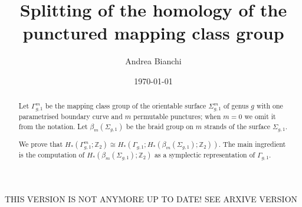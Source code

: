 \documentclass{amsart}
\theoremstyle{plain}
\theoremstyle{definition}
\begin{document}
\title{Splitting of the homology of the punctured mapping class group}

\author{Andrea Bianchi}

\address{Mathematics Institute,
University of Bonn,
Endenicher Allee 60, Bonn,
Germany
}




\date{\today}




\begin{abstract}
Let $\Gamma_{g,1}^m$ be the mapping class group of the orientable surface $\Sigma_{g,1}^m$ of genus $g$ with one parametrised
boundary curve and $m$ permutable punctures; when $m=0$ we omit it from the notation.
Let $\beta_{m}(\Sigma_{g,1})$ be the braid group on $m$ strands
of the surface $\Sigma_{g,1}$.

\noindent We prove that $H_*(\Gamma_{g,1}^m;\mathbb{Z}_2)\cong H_*(\Gamma_{g,1};H_*(\beta_{m}(\Sigma_{g,1});\mathbb{Z}_2))$. The main ingredient
is the computation of $H_*(\beta_{m}(\Sigma_{g,1});\mathbb{Z}_2)$ as a symplectic representation of $\Gamma_{g,1}$.

% 
% 
\end{abstract}


\maketitle
THIS VERSION IS NOT ANYMORE UP TO DATE! SEE ARXIVE VERSION












 


{}

\end{document}
